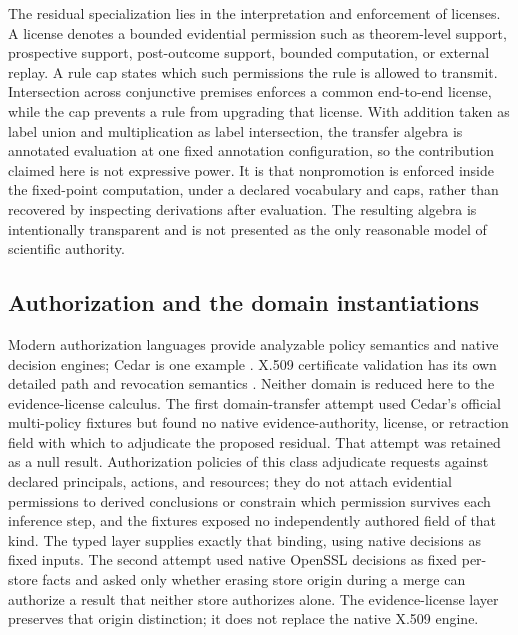 \documentclass[pdflatex,sn-mathphys-num]{sn-jnl}
\begin{document}
The residual specialization lies in the interpretation and enforcement of licenses. A license denotes a bounded evidential permission such as theorem-level support, prospective support, post-outcome support, bounded computation, or external replay. A rule cap states which such permissions the rule is allowed to transmit. Intersection across conjunctive premises enforces a common end-to-end license, while the cap prevents a rule from upgrading that license. With addition taken as label union and multiplication as label intersection, the transfer algebra is annotated evaluation at one fixed annotation configuration, so the contribution claimed here is not expressive power. It is that nonpromotion is enforced inside the fixed-point computation, under a declared vocabulary and caps, rather than recovered by inspecting derivations after evaluation. The resulting algebra is intentionally transparent and is not presented as the only reasonable model of scientific authority.

\subsection{Authorization and the domain instantiations}\label{authorization-and-the-domain-instantiations}

Modern authorization languages provide analyzable policy semantics and native decision engines; Cedar is one example \citep{cutler2024}. X.509 certificate validation has its own detailed path and revocation semantics \citep{rfc5280}. Neither domain is reduced here to the evidence-license calculus. The first domain-transfer attempt used Cedar's official multi-policy fixtures but found no native evidence-authority, license, or retraction field with which to adjudicate the proposed residual. That attempt was retained as a null result. Authorization policies of this class adjudicate requests against declared principals, actions, and resources; they do not attach evidential permissions to derived conclusions or constrain which permission survives each inference step, and the fixtures exposed no independently authored field of that kind. The typed layer supplies exactly that binding, using native decisions as fixed inputs. The second attempt used native OpenSSL decisions as fixed per-store facts and asked only whether erasing store origin during a merge can authorize a result that neither store authorizes alone. The evidence-license layer preserves that origin distinction; it does not replace the native X.509 engine.
\end{document}
